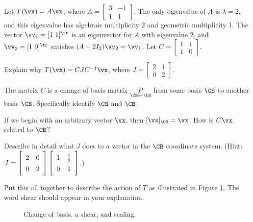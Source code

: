 \begin{activity} \label{act:JCF_geometry} Let $T(\vx) = A\vx$, where $A = \left[ \begin{array}{cr} 3&-1\\1&1 \end{array} \right]$. The only eigenvalue of $A$ is $\lambda = 2$, and this eigenvalue has algebraic multiplicity 2 and geometric multiplicity 1. The vector $\vv_1 = [1 \ 1]^{\tr}$ is an eigenvector for $A$ with eigenvalue $2$, and $\vv_2 = [1 \ 0]^{\tr}$ satisfies $(A - 2I_2)\vv_2 = \vv_1$. Let $C = \left[ \begin{array}{cc} 1&1\\1&0 \end{array} \right]$.
\ba
\item Explain why $T(\vx) = CJC^{-1}\vx$, where $J = \left[ \begin{array}{cc} 2&1\\0&2 \end{array} \right]$.  

\item The matrix $C$ is a change of basis matrix $\underset{\CB \leftarrow \CS}{P}$ from some basis $\CS$ to another basis $\CB$. Specifically identify $\CS$ and $\CB$. 

\item If we begin with an arbitrary vector $\vx$, then $[\vx]_{\CS} = \vx$. How is $C \vx$ related to $\CB$? 

\item Describe in detail what $J$ does to a vector in the $\CB$ coordinate system. (Hint: $J =  \left[ \begin{array}{cc} 2&0\\0&2 \end{array} \right]  \left[ \renewcommand{\arraystretch}{1.4}\begin{array}{cc} 1&\frac{1}{2}\\0&1 \end{array} \right]$.)

\item Put this all together to describe the action of $T$ as illustrated in Figure \ref{F:JCF_shear_3}. The word shear should appear in your explanation. 

\ea

\end{activity}
 
\begin{figure}[ht]
\begin{center}
\end{center}
\caption{Change of basis, a shear, and scaling.}
\label{F:JCF_shear_3}
\end{figure}

